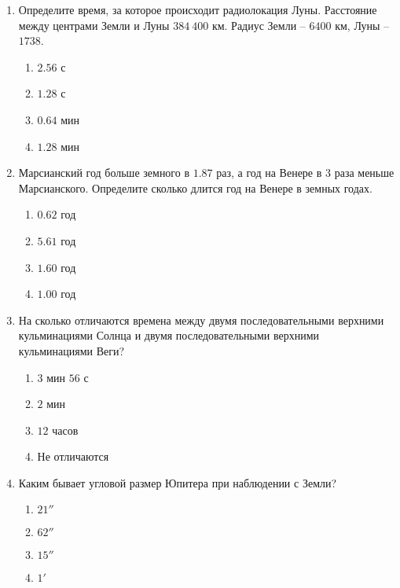 \documentclass[12pt]{article}
\begin{document}
\begin{enumerate}[resume]
	\item Определите время, за которое происходит радиолокация Луны. Расстояние между центрами Земли и Луны $384~400$ км. Радиус Земли -- $6400$ км, Луны -- $1738$.
	\begin{multicols}{2}
		\begin{enumerate}[label=\textbf{\Alph*.}]
			\item{$2.56$ с} \item{$1.28$ с}
			\item{$0.64$ мин} \item{$1.28$ мин} 
		\end{enumerate}	
	\end{multicols}

	\item Марсианский год больше земного в $1.87$ раз, а год на Венере в $3$ раза меньше Марсианского. Определите сколько длится год на Венере в земных годах.
	\begin{multicols}{2}
		\begin{enumerate}[label=\textbf{\Alph*.}]
			\item{$0.62$ год} \item{$5.61$ год}
			\item{$1.60$ год} \item{$1.00$ год} 
		\end{enumerate}	
	\end{multicols}

	\item На сколько отличаются времена между двумя последовательными верхними кульминациями Солнца и двумя последовательными верхними кульминациями Веги?
	\begin{multicols}{2}
		\begin{enumerate}[label=\textbf{\Alph*.}]
			\item{$3$ мин $56$ с} \item{$2$ мин}
			\item{$12$ часов} \item{Не отличаются} 
		\end{enumerate}	
	\end{multicols}

	\item Каким бывает угловой размер Юпитера при наблюдении с Земли?
	\begin{multicols}{2}
		\begin{enumerate}[label=\textbf{\Alph*.}]
			\item{$21''$} \item{$62''$}
			\item{$15''$} \item{$1'$} 
		\end{enumerate}	
	\end{multicols}


\end{enumerate}
\end{document}
